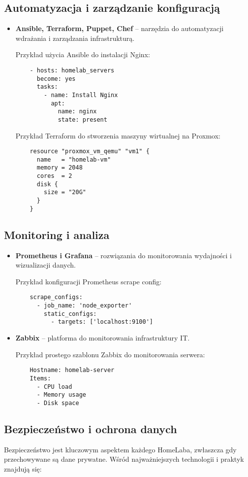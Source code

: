 \subsection{Automatyzacja i zarządzanie konfiguracją}
\begin{itemize}
    \item \textbf{Ansible, Terraform, Puppet, Chef} – narzędzia do automatyzacji wdrażania i zarządzania infrastrukturą.

    Przykład użycia Ansible do instalacji Nginx:
    \begin{verbatim}
    - hosts: homelab_servers
      become: yes
      tasks:
        - name: Install Nginx
          apt:
            name: nginx
            state: present
    \end{verbatim}

    Przykład Terraform do stworzenia maszyny wirtualnej na Proxmox:
    \begin{verbatim}
    resource "proxmox_vm_qemu" "vm1" {
      name   = "homelab-vm"
      memory = 2048
      cores  = 2
      disk {
        size = "20G"
      }
    }
    \end{verbatim}
\end{itemize}

\subsection{Monitoring i analiza}
\begin{itemize}
    \item \textbf{Prometheus i Grafana} – rozwiązania do monitorowania wydajności i wizualizacji danych.
    
    Przykład konfiguracji Prometheus scrape config:
    \begin{verbatim}
    scrape_configs:
      - job_name: 'node_exporter'
        static_configs:
          - targets: ['localhost:9100']
    \end{verbatim}
    
    \item \textbf{Zabbix} – platforma do monitorowania infrastruktury IT.
    
    Przykład prostego szablonu Zabbix do monitorowania serwera:
    \begin{verbatim}
    Hostname: homelab-server
    Items:
      - CPU load
      - Memory usage
      - Disk space
    \end{verbatim}
\end{itemize}

\subsection{Bezpieczeństwo i ochrona danych}
Bezpieczeństwo jest kluczowym aspektem każdego HomeLaba, zwłaszcza gdy przechowywane są dane prywatne. Wśród najważniejszych technologii i praktyk znajdują się:


